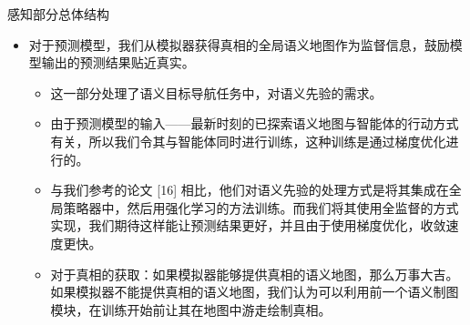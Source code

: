 \begin{frame}{感知部分总体结构}
{\begin{itemize}
\begin{itemize}
\begin{itemize}
                        \end{itemize}
                    \item 对于预测模型，我们从模拟器获得真相的全局语义地图作为监督信息，鼓励模型输出的预测结果贴近真实。
                    \begin{itemize}
                        \item 这一部分处理了语义目标导航任务中，对语义先验的需求。
                        \item 由于预测模型的输入——最新时刻的已探索语义地图与智能体的行动方式有关，所以我们令其与智能体同时进行训练，这种训练是通过梯度优化进行的。
                        \item 与我们参考的论文 [16] 相比，他们对语义先验的处理方式是将其集成在全局策略器中，然后用强化学习的方法训练。而我们将其使用全监督的方式实现，我们期待这样能让预测结果更好，并且由于使用梯度优化，收敛速度更快。
                        \item 对于真相的获取：如果模拟器能够提供真相的语义地图，那么万事大吉。如果模拟器不能提供真相的语义地图，我们认为可以利用前一个语义制图模块，在训练开始前让其在地图中游走绘制真相。
                    \end{itemize}
                \end{itemize}
        \end{itemize}

    }    
\end{frame}
